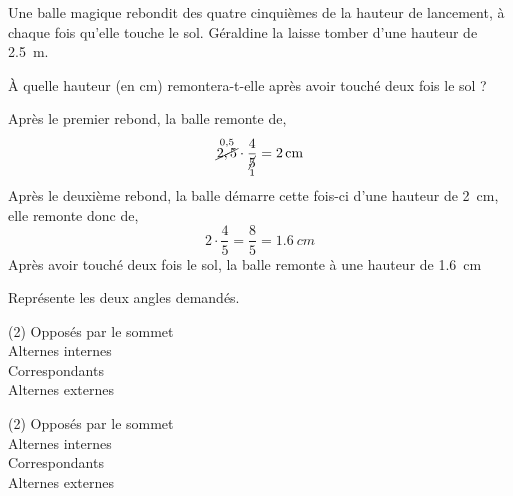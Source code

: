 \documentclass[a4paper,fontsize=12pt, parskip=half]{scrartcl}
\begin{document}
\begin{exercise}
    Une balle magique rebondit des quatre cinquièmes de la hauteur de lancement,
    à chaque fois qu'elle touche le sol. Géraldine la laisse tomber d'une
    hauteur de \SI{2,5}{m}.\par
    À quelle hauteur (en cm) remontera-t-elle après avoir touché deux fois le
    sol ?
\end{exercise}
\begin{solution}
    \begin{center}
        
    \end{center}
    Après le premier rebond, la balle remonte de,
    \begin{equation*}
        \simpup{2,5}{0,5}\cdot\dfrac{4}{\simpdown{5}{1}} = \SI{2}{cm}
    \end{equation*}
    Après le deuxième rebond, la balle démarre cette fois-ci d'une hauteur de
    \SI{2}{cm}, elle remonte donc de,
    \begin{equation*}
        2\cdot\dfrac{4}{5} = \dfrac{8}{5} = \SI{1,6}{cm}
    \end{equation*}
    Après avoir touché deux fois le sol, la balle remonte à une hauteur de
    \SI{1,6}{cm}
\end{solution}

\begin{exercise}
    Représente les deux angles demandés.
    \begin{tasks}(2)
        \task Opposés par le sommet\\
        
        \task Alternes internes\\
        
        \task Correspondants\\
        
        \task Alternes externes\\
        
    \end{tasks}
\end{exercise}
\begin{solution}
    \begin{tasks}(2)
        \task Opposés par le sommet\\
        \task Alternes internes\\
        \task Correspondants\\
        \task Alternes externes\\
    \end{tasks}
    \pagebreak
\end{solution}
\end{document}
